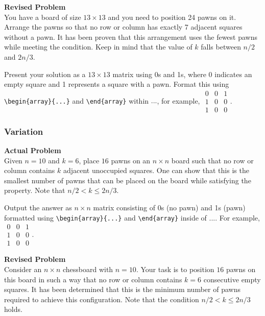 \textbf{Revised Problem}\\
You have a board of size \(13 \times 13\) and you need to position 24 pawns on it. Arrange the pawns so that no row or column has exactly 7 adjacent squares without a pawn. It has been proven that this arrangement uses the fewest pawns while meeting the condition. Keep in mind that the value of \( k \) falls between \( n/2 \) and \( 2n/3 \).

Present your solution as a \(13 \times 13\) matrix using 0s and 1s, where 0 indicates an empty square and 1 represents a square with a pawn. Format this using \verb|\begin{array}{...}| and \verb|\end{array}| within $\boxed{...}$, for example, $\boxed{\begin{array}{ccc}0 & 0 & 1 \\ 1 & 0 & 0 \\ 1 & 0 & 0\end{array}}$.

\subsubsection{Variation}
\textbf{Actual Problem}\\
Given $n=10$ and $k=6$, place $16$ pawns on an $n \times n$ board such that no row or column contains $k$ adjacent unoccupied squares.
One can show that this is the smallest number of pawns that can be placed on the board while satisfying the property.
Note that $n/2 < k \leq 2n/3$.

Output the answer as $n \times n$ matrix consisting of 0s (no pawn) and 1s (pawn) formatted using \verb|\begin{array}{...}| and \verb|\end{array}| inside of $\boxed{...}$. For example, $\boxed{\begin{array}{ccc}0 & 0 & 1 \\ 1 & 0 & 0 \\ 1 & 0 & 0\end{array}}$.

\textbf{Revised Problem}\\
Consider an $n \times n$ chessboard with $n=10$. Your task is to position $16$ pawns on this board in such a way that no row or column contains $k=6$ consecutive empty squares. It has been determined that this is the minimum number of pawns required to achieve this configuration. Note that the condition $n/2 < k \leq 2n/3$ holds.

